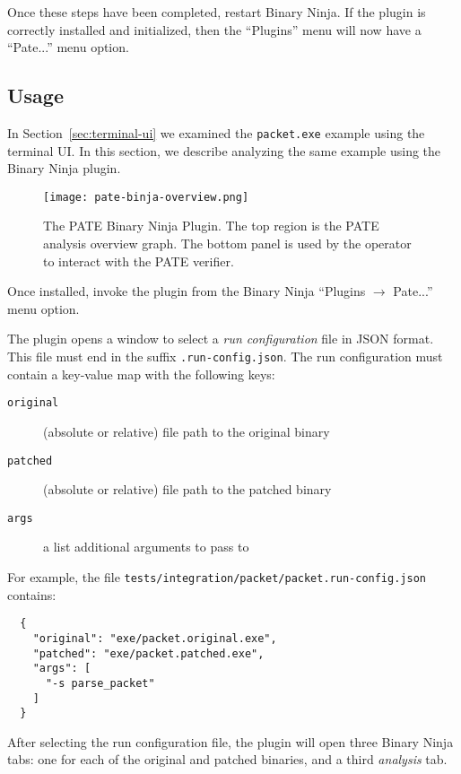 Once these steps have been completed, restart Binary Ninja.
If the plugin is correctly installed and initialized, then the ``Plugins'' menu will now have a ``Pate...'' menu option.

\subsection{Usage}

In Section~\ref{sec:terminal-ui} we examined the \texttt{packet.exe} example using the \pate{} terminal UI.
In this section, we describe analyzing the same example using the \pate{} Binary Ninja plugin.

\begin{figure}[h]
  \centering
  \texttt{[image: pate-binja-overview.png]}
  \caption{The PATE Binary Ninja Plugin. The top region is the PATE analysis overview graph. The bottom panel is used by the operator to interact with the PATE verifier.}
  \label{fig:overview}
\end{figure}

Once installed, invoke the \pate{} plugin from the Binary Ninja ``Plugins $\rightarrow$ Pate...'' menu option.

The \pate{} plugin opens a window to select a \emph{run configuration} file in JSON format.
This file must end in the suffix \texttt{.run-config.json}.
The run configuration must contain a key-value map with the following keys:
\begin{description}
    \item[\texttt{original}] (absolute or relative) file path to the original binary
    \item[\texttt{patched}] (absolute or relative) file path to the patched binary
    \item[\texttt{args}] a list additional arguments to pass to \pate{}
\end{description}

For example, the file \texttt{tests/integration/packet/packet.run-config.json} contains:

\begin{verbatim}
  {
    "original": "exe/packet.original.exe",
    "patched": "exe/packet.patched.exe",
    "args": [
      "-s parse_packet"
    ]
  }
\end{verbatim}

After selecting the run configuration file, the \pate{} plugin will open three Binary Ninja tabs: one for each of the original and patched binaries, and a third \emph{\pate{} analysis} tab.

